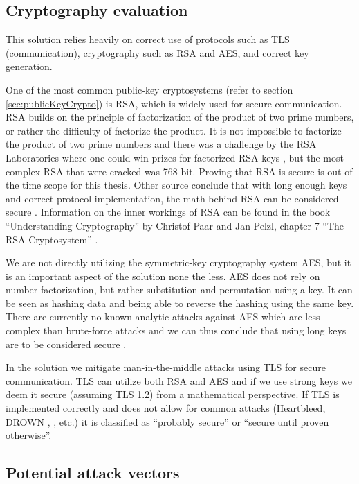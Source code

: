 \subsection{Cryptography evaluation}
This solution relies heavily on correct use of protocols such as TLS (communication), cryptography such as RSA and AES, and correct key generation.

One of the most common public-key cryptosystems (refer to section \ref{sec:publicKeyCrypto}) is RSA, which is widely used for secure communication. RSA builds on the principle of factorization of the product of two prime numbers, or rather the difficulty of factorize the product. It is not impossible to factorize the product of two prime numbers and there was a challenge by the RSA Laboratories where one could win prizes for factorized RSA-keys \cite{rsaChallenge}, but the most complex RSA that were cracked was 768-bit. Proving that RSA is secure is out of the time scope for this thesis. Other source conclude that with long enough keys and correct protocol implementation, the math behind RSA can be considered secure \cite[~p. 194]{cryptoMath}. Information on the inner workings of RSA can be found in the book ``Understanding Cryptography'' by Christof Paar and Jan Pelzl, chapter 7 ``The RSA Cryptosystem'' \cite{cryptoMath}.

We are not directly utilizing the symmetric-key cryptography system AES, but it is an important aspect of the solution none the less. AES does not rely on number factorization, but rather substitution and permutation using a key. It can be seen as hashing data and being able to reverse the hashing using the same key. There are currently no known analytic attacks against AES which are less complex than brute-force attacks and we can thus conclude that using long keys are to be considered secure \cite[~p. 116-117]{cryptoMath}.

In the solution we mitigate man-in-the-middle attacks using TLS for secure communication. TLS can utilize both RSA and AES and if we use strong keys we deem it secure (assuming TLS 1.2) from a mathematical perspective. If TLS is implemented correctly and does not allow for common attacks (Heartbleed, DROWN \cite{drown}, , etc.) it is classified as ``probably secure'' or ``secure until proven otherwise''.


\subsection{Potential attack vectors}
\label{sec:attackVectors}

